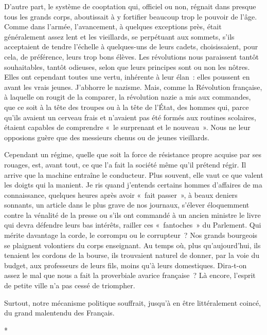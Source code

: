 \documentclass[french,twoside]{book} %
\begin{document}
D’autre part, le système de cooptation qui,   officiel ou non, régnait dans presque tous les grands corps, aboutissait à y fortifier beaucoup trop le pouvoir de l’âge. Comme dans l’armée, l’avancement, à quelques exceptions près, était généralement assez lent et les vieillards, se perpétuant aux sommets, s’ils acceptaient de tendre l’échelle à quelques-uns de leurs cadets, choisissaient, pour cela, de préférence, leurs trop bons élèves. Les révolutions nous paraissent tantôt souhaitables, tantôt odieuses, selon que leurs principes sont ou non les nôtres. Elles ont cependant toutes une vertu, inhérente à leur élan : elles poussent en avant les vrais jeunes. J’abhorre le nazisme. Mais, comme la Révolution française, à laquelle on rougit de la comparer, la révolution nazie a mis aux commandes, que ce soit à la tête des troupes ou à la tête de l’État, des hommes qui, parce qu’ils avaient un cerveau frais et n’avaient pas été formés aux routines scolaires, étaient capables de comprendre « le surprenant et le nouveau ». Nous ne leur opposions guère que des messieurs chenus ou de jeunes vieillards.\par
Cependant un régime, quelle que soit la force de résistance propre acquise par ses rouages, est, avant tout, ce que l’a fait la société même qu’il prétend régir. Il arrive que la machine entraîne le conducteur. Plus souvent, elle vaut ce que valent les doigts qui la manient. Je ris quand j’entends certains hommes d’affaires de ma connaissance, quelques heures après avoir « fait passer », à beaux deniers sonnants, un article dans le plus grave de nos journaux, s’élever éloquemment contre la vénalité de la presse ou s’ils ont commandé à un ancien ministre le livre qui devra défendre leurs bas intérêts, railler ces « fantoches » du Parlement. Qui mérite davantage la corde, le corrompu ou le corrupteur ? Nos grands bourgeois se plaignent volontiers du corps enseignant. Au temps où, plus qu’aujourd’hui, ils tenaient les cordons de la bourse, ils trouvaient naturel de donner, par la voie du budget, aux professeurs de   leurs fils, moins qu’à leurs domestiques. Dira-t-on assez le mal que nous a fait la proverbiale avarice française ? Là encore, l’esprit de petite ville n’a pas cessé de triompher.\par
Surtout, notre mécanisme politique souffrait, jusqu’à en être littéralement coincé, du grand malentendu des Français.\par

\begin{center}
*\par
\end{center}
\end{document}
